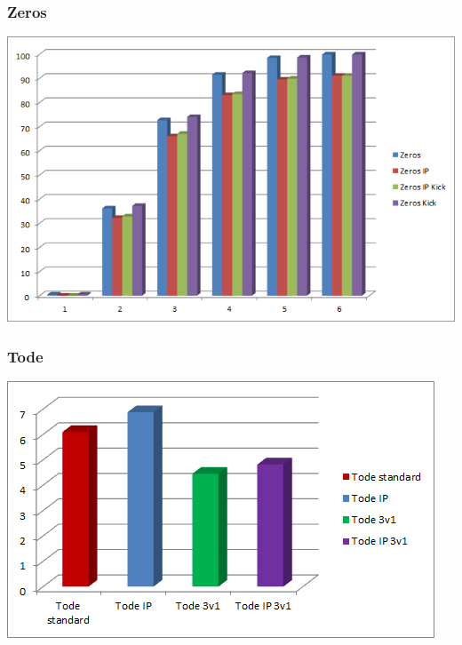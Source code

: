 \documentclass{beamer}
\begin{document}
\begin{frame}
	\frametitle{Zeros}
	\begin{center}
		\includegraphics[scale=0.6]{img/Zeros.png}
	\end{center}
\end{frame}

\begin{frame}
	\frametitle{Tode}
	\begin{center}
		\includegraphics[scale=0.77]{img/Deaths.png}
	\end{center}
\end{frame}
\end{document}
